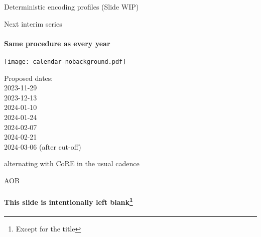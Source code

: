 \documentclass[aspectratio=169]{beamer}
\begin{document}
\begin{frame}{Deterministic encoding profiles}\large
    (Slide WIP)
\end{frame}

\begin{frame}{Next interim series}\large
    \framesubtitle{Same procedure as every year}
    \begin{block}{\texttt{[image: calendar-nobackground.pdf]}\mbox{\quad}}
    \end{block}
    \vspace{-2cm}

    Proposed dates:\\
    2023-11-29\\
    2023-12-13\\
    2024-01-10\\
    2024-01-24\\
    2024-02-07\\
    2024-02-21\\
    2024-03-06 (after cut-off)

    \bigskip

    alternating with CoRE in the usual cadence
\end{frame}

\begin{frame}{AOB}\large
    \framesubtitle{This slide is intentionally left blank\footnote{Except for the title}}
\end{frame}
\end{document}
